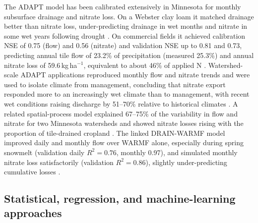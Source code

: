 The ADAPT model has been calibrated extensively in Minnesota for monthly subsurface drainage and nitrate loss. On a Webster clay loam it matched drainage better than nitrate loss, under-predicting drainage in wet months and nitrate in some wet years following drought \parencite{Davis2000}. On commercial fields it achieved calibration NSE of 0.75 (flow) and 0.56 (nitrate) and validation NSE up to 0.81 and 0.73, predicting annual tile flow of 23.2\% of precipitation (measured 25.3\%) and annual nitrate loss of 59.6\,kg\,ha$^{-1}$, equivalent to about 46\% of applied N \parencite{Nangia2008,Nangia2010c}. Watershed-scale ADAPT applications reproduced monthly flow and nitrate trends and were used to isolate climate from management, concluding that nitrate export responded more to an increasingly wet climate than to management, with recent wet conditions raising discharge by 51--70\% relative to historical climates \parencite{Nangia2010,Nangia2010b}. A related spatial-process model explained 67--75\% of the variability in flow and nitrate for two Minnesota watersheds and showed nitrate losses rising with the proportion of tile-drained cropland \parencite{Gowda2007}. The linked DRAIN-WARMF model improved daily and monthly flow over WARMF alone, especially during spring snowmelt (validation daily $R^2 = 0.76$, monthly 0.97), and simulated monthly nitrate loss satisfactorily (validation $R^2 = 0.86$), slightly under-predicting cumulative losses \parencite{Dayyani2010}.

\subsection{Statistical, regression, and machine-learning approaches}

